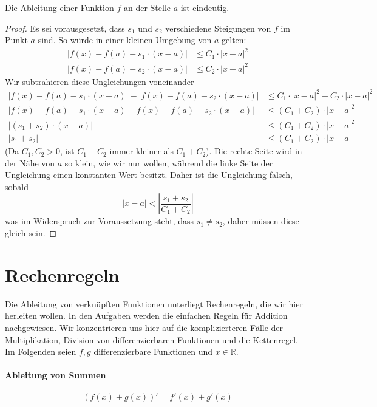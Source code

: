 \begin{lemma}
Die Ableitung einer Funktion $f$ an der Stelle $a$ ist eindeutig. 
\end{lemma}
\begin{proof}
Es sei vorausgesetzt, dass $s_1$ und $s_2$ verschiedene Steigungen von $f$ im Punkt $a$ sind. So würde in einer kleinen Umgebung von $a$ gelten:
\begin{equation*}
\begin{split}
|f(x)-f(a) -s_1\cdot (x-a)| &\le C_1\cdot |x-a|^2 \\
|f(x)-f(a) -s_2\cdot (x-a)| &\le C_2\cdot |x-a|^2
\end{split}
\end{equation*}
Wir subtrahieren diese Ungleichungen voneinander
\begin{equation}
\begin{split}
|f(x)-f(a) -s_1\cdot (x-a)|-|f(x)-f(a) -s_2\cdot (x-a)| &\le C_1\cdot |x-a|^2-C_2\cdot |x-a|^2 \\
|f(x)-f(a) -s_1\cdot (x-a)-f(x)-f(a) -s_2\cdot (x-a)| &\le (C_1+C_2)\cdot |x-a|^2 \\
|(s_1+s_2)\cdot (x-a)| &\le (C_1+C_2)\cdot |x-a|^2 \\
|s_1+s_2| &\le (C_1+C_2)\cdot |x-a|
\end{split}
\end{equation}
(Da $C_1,C_2 >0$, ist $C_1-C_2$ immer kleiner als $C_1+C_2$). Die rechte Seite wird in der Nähe von $a$ so klein, wie wir nur wollen, während die linke Seite der Ungleichung einen konstanten Wert besitzt. Daher ist die Ungleichung falsch, sobald 
\[
|x-a| < \left| \frac{s_1+s_2}{C_1+C_2} \right|
\]
was im Widerspruch zur Voraussetzung steht, dass $s_1\ne s_2$, daher müssen diese gleich sein.
\end{proof}

\section{Rechenregeln}

Die Ableitung von verknüpften Funktionen unterliegt Rechenregeln, die wir hier herleiten wollen. In den Aufgaben werden die einfachen Regeln für Addition nachgewiesen. Wir konzentrieren uns hier auf die komplizierteren Fälle der Multiplikation, Division von differenzierbaren Funktionen und die Kettenregel. Im Folgenden seien $f,g$ differenzierbare Funktionen und $x\in \mathbb{R}$.

\paragraph{Ableitung von Summen}
\begin{equation}
\left(f(x)+g(x) \right)' = f'(x)+ g'(x)
\end{equation}

